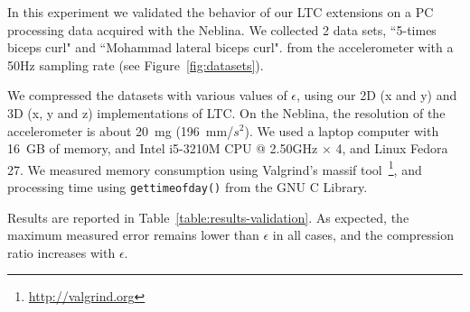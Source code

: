 \documentclass[10pt, conference, compsocconf]{IEEEtran}
\begin{document}
In this experiment we validated the behavior of our LTC extensions on a 
PC processing data acquired with the Neblina. We collected 2 data sets, 
``5-times biceps curl" and ``Mohammad lateral biceps curl". from the 
accelerometer with a 50Hz sampling rate (see 
Figure~\ref{fig:datasets}). 

We compressed the datasets with various values of $\epsilon$, using our 
2D (x and y) and 3D (x, y and z) implementations of LTC. On the Neblina,
the resolution of the accelerometer is about 20~mg (196~mm/$s^2$).
 We used a 
laptop computer with 16~GB of memory, and Intel i5-3210M CPU @ 2.50GHz 
× 4, and Linux Fedora 27. We measured memory consumption using 
Valgrind's massif 
tool~\cite{nethercote2006building}\footnote{\url{http://valgrind.org}}, 
and processing time using \texttt{gettimeofday()} from the GNU C 
Library. 

Results are reported in Table~\ref{table:results-validation}. 
As expected, the maximum measured error remains lower than $\epsilon$ in 
all cases, and the compression ratio increases with $\epsilon$. 


\end{document}
